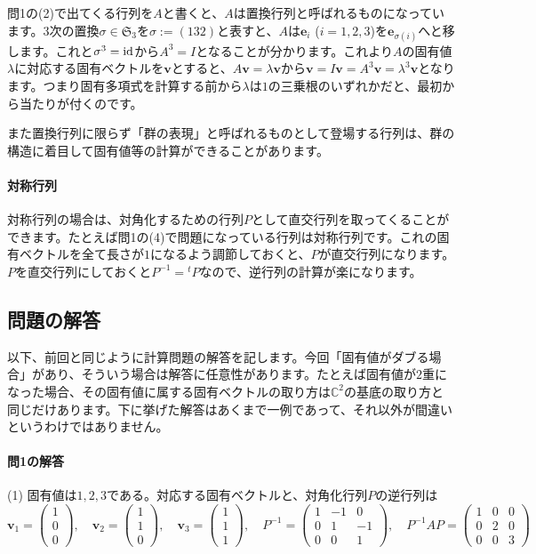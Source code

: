 問1の(2)で出てくる行列を$A$と書くと、$A$は置換行列と呼ばれるものになっています。$3$次の置換$\sigma \in \mathfrak{S}_3$を$\sigma := (132)$と表すと、$A$は$\bm{e}_i$ ($i = 1, 2, 3$)を$\bm{e}_{\sigma(i)}$へと移します。これと$\sigma^3 = \operatorname{id}$から$A^3 = I$となることが分かります。これより$A$の固有値$\lambda$に対応する固有ベクトルを$\bm{v}$とすると、$A\bm{v} = \lambda\bm{v}$から$\bm{v} = I\bm{v} = A^3 \bm{v} = \lambda^3 \bm{v}$となります。つまり固有多項式を計算する前から$\lambda$は$1$の三乗根のいずれかだと、最初から当たりが付くのです。

また置換行列に限らず「群の表現」と呼ばれるものとして登場する行列は、群の構造に着目して固有値等の計算ができることがあります。

\paragraph{対称行列}

対称行列の場合は、対角化するための行列$P$として直交行列を取ってくることができます。たとえば問1の(4)で問題になっている行列は対称行列です。これの固有ベクトルを全て長さが$1$になるよう調節しておくと、$P$が直交行列になります。$P$を直交行列にしておくと$P^{-1} = {}^tP$なので、逆行列の計算が楽になります。

\subsection{問題の解答}

以下、前回と同じように計算問題の解答を記します。今回「固有値がダブる場合」があり、そういう場合は解答に任意性があります。たとえば固有値が$2$重になった場合、その固有値に属する固有ベクトルの取り方は$\mathbb{C}^2$の基底の取り方と同じだけあります。下に挙げた解答はあくまで一例であって、それ以外が間違いというわけではありません。

\paragraph{問1の解答}

(1) 固有値は$1, 2, 3$である。対応する固有ベクトルと、対角化行列$P$の逆行列は
\[
\bm{v}_1 = 
\begin{pmatrix}
1 \\
0 \\
0
\end{pmatrix}, \quad
\bm{v}_2 = 
\begin{pmatrix}
1 \\
1 \\
0
\end{pmatrix}, \quad
\bm{v}_3 = 
\begin{pmatrix}
1 \\
1 \\
1
\end{pmatrix}, \quad
P^{-1} = 
\begin{pmatrix}
1 & -1 & 0 \\
0 & 1 & -1 \\
0 & 0 & 1
\end{pmatrix}, \quad
P^{-1} AP =
\begin{pmatrix}
1 & 0 & 0 \\
0 & 2 & 0 \\
0 & 0 & 3
\end{pmatrix}
\]

